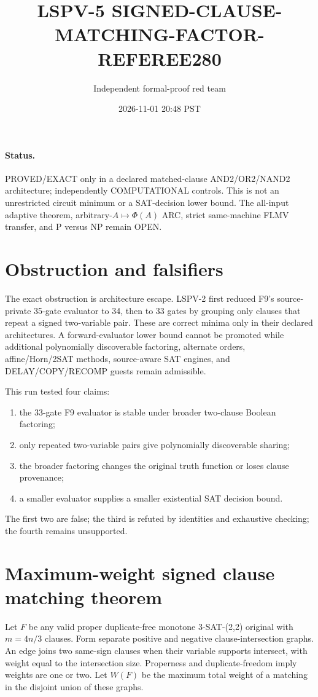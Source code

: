 \documentclass[11pt]{article}
\title{LSPV-5 SIGNED-CLAUSE-MATCHING-FACTOR-REFEREE280}
\author{Independent formal-proof red team}
\date{2026-11-01 20:48 PST}
\begin{document}
\maketitle

\paragraph{Status.}
PROVED/EXACT only in a declared matched-clause AND2/OR2/NAND2 architecture;
independently COMPUTATIONAL controls.  This is not an unrestricted circuit minimum or a
SAT-decision lower bound.  The all-input adaptive theorem, arbitrary-$A\mapsto\Phi(A)$ ARC,
strict same-machine FLMV transfer, and P versus NP remain OPEN.

\section{Obstruction and falsifiers}

The exact obstruction is architecture escape.  LSPV-2 first reduced F9's source-private
35-gate evaluator to 34, then to 33 gates by grouping only clauses that repeat a signed
two-variable pair.  These are correct minima only in their declared architectures.  A
forward-evaluator lower bound cannot be promoted while additional polynomially discoverable
factoring, alternate orders, affine/Horn/2SAT methods, source-aware SAT engines, and
DELAY/COPY/RECOMP guests remain admissible.

This run tested four claims:
\begin{enumerate}
\item the 33-gate F9 evaluator is stable under broader two-clause Boolean factoring;
\item only repeated two-variable pairs give polynomially discoverable sharing;
\item the broader factoring changes the original truth function or loses clause provenance;
\item a smaller evaluator supplies a smaller existential SAT decision bound.
\end{enumerate}
The first two are false; the third is refuted by identities and exhaustive checking; the
fourth remains unsupported.

\section{Maximum-weight signed clause matching theorem}

Let $F$ be any valid proper duplicate-free monotone 3-SAT-(2,2) original with $m=4n/3$
clauses.  Form separate positive and negative clause-intersection graphs.  An edge joins two
same-sign clauses when their variable supports intersect, with weight equal to the
intersection size.  Properness and duplicate-freedom imply weights are one or two.  Let
$W(F)$ be the maximum total weight of a matching in the disjoint union of these graphs.
\end{document}
